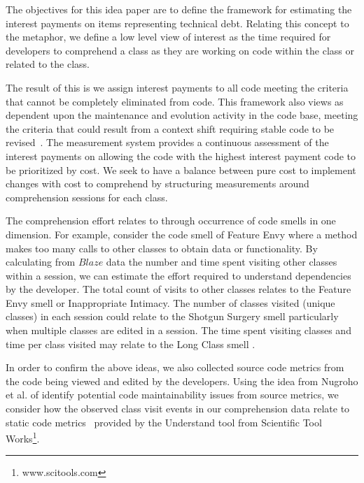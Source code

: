 The objectives for this idea paper are to define the framework for estimating the interest payments on items representing technical debt.  Relating this concept to the \TD  metaphor, we define a low level view of interest as the time required for developers to comprehend a class as they are working on code within the class or related to the class.   

The result of this is we assign interest payments to all code meeting the criteria that \TD cannot be completely eliminated from code.  This framework also views \TD as dependent upon the maintenance and evolution activity in the code base, meeting the criteria that \TD could result from a context shift requiring stable code to be revised~\cite{Ozkaya2012Technical}. The measurement system provides a continuous assessment of the interest payments on \TD allowing the code with the highest interest payment code to be prioritized by cost.  We seek to have a balance between pure cost to implement changes with cost to comprehend by structuring measurements around comprehension sessions for each class.

The comprehension effort relates to \TD through occurrence of code smells in one dimension.  For example, consider the code smell of Feature Envy where a method makes too many calls to other classes to obtain data or functionality.  By calculating from $Blaze$ data the number and time spent visiting other classes within a session, we can estimate the effort required to understand dependencies by the developer.  The total count of visits to other classes relates to the Feature Envy smell or Inappropriate Intimacy.  The number of classes visited (unique classes) in each session could  relate to the Shotgun Surgery smell particularly when multiple classes are edited in a session.  The time spent visiting classes and time per class visited may relate to the Long Class smell \cite{Fowler_etal:1999}.  

In order to confirm the above ideas, we also collected source code metrics from the code being viewed and edited by the developers.  Using the idea from Nugroho et al. of identify potential code maintainability issues from source metrics, we consider how the observed class visit events in our comprehension data relate to static code metrics~\cite{Nugroho2011Empirical} provided by the Understand tool from Scientific Tool Works\footnote{www.scitools.com}.   
